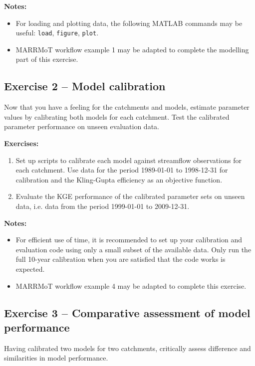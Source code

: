 \documentclass[12pt]{article}
\begin{document}
\medskip \noindent
\textbf{Notes:}
\begin{itemize}
	\item For loading and plotting data, the following MATLAB commands may be useful: \texttt{load}, \texttt{figure}, \texttt{plot}.
	\item MARRMoT workflow example 1 may be adapted to complete the modelling part of this exercise.
\end{itemize}


%
\subsection{Exercise 2 – Model calibration}

Now that you have a feeling for the catchments and models, estimate parameter values by calibrating both models for each catchment. Test the calibrated parameter performance on unseen evaluation data. 

\medskip \noindent
\textbf{Exercises:}
\begin{enumerate}
	\item Set up scripts to calibrate each model against streamflow observations for each catchment. Use data for the period 1989-01-01 to 1998-12-31 for calibration and the Kling-Gupta efficiency \citep[KGE,][]{Gupta2008} as an objective function.
	\item Evaluate the KGE performance of the calibrated parameter sets on unseen data, i.e. data from the period 1999-01-01 to 2009-12-31.
\end{enumerate}

\medskip \noindent
\textbf{Notes:}
\begin{itemize}
	\item For efficient use of time, it is recommended to set up your calibration and evaluation code using only a small subset of the available data. Only run the full 10-year calibration when you are satisfied that the code works is expected.
	\item MARRMoT workflow example 4 may be adapted to complete this exercise.
\end{itemize}


%
\subsection{Exercise 3 – Comparative assessment of model performance}

Having calibrated two models for two catchments, critically assess difference and similarities in model performance. 
\end{document}
